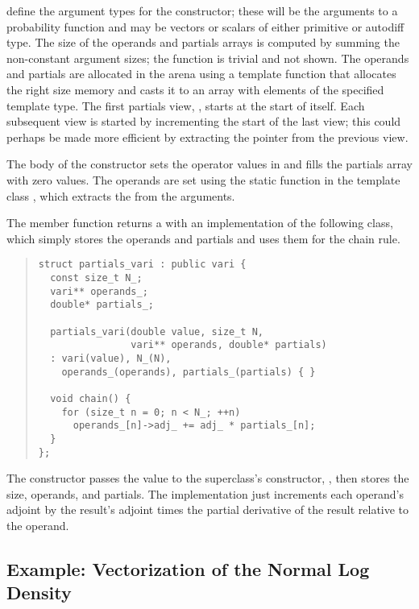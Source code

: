 \documentclass[10pt]{article}
\begin{document}
define the argument types for the constructor; these will be the
arguments to a probability function and may be vectors or scalars of
either primitive or autodiff type.  The size  of the
operands and partials arrays is computed by summing the non-constant
argument sizes; the function  is trivial and not shown.
The operands  and partials  are allocated
in the arena using a template function that allocates the right size
memory and casts it to an array with elements of the specified
template type.  The first partials view, , starts at the
start of  itself.  Each subsequent view is started
by incrementing the start of the last view;  this could perhaps be
made more efficient by extracting the pointer from the previous view.

The body of the constructor sets the operator values in 
and fills the partials array with zero values.  The operands are set
using the static function  in the template class
, which extracts the  from the
arguments.  

The member function  returns a  with
an implementation of the following class, which simply stores the
operands and partials and uses them for the chain rule.
%
\begin{quote}
\begin{Verbatim}
struct partials_vari : public vari {
  const size_t N_;
  vari** operands_;   
  double* partials_;

  partials_vari(double value, size_t N,
                vari** operands, double* partials)
  : vari(value), N_(N),
    operands_(operands), partials_(partials) { }

  void chain() {
    for (size_t n = 0; n < N_; ++n)
      operands_[n]->adj_ += adj_ * partials_[n];
  }
};
\end{Verbatim}
\end{quote}
%
The constructor passes the value to the superclass's constructor,
, then stores the size, operands, and partials.
The  implementation just increments each operand's
adjoint by the result's adjoint times the partial derivative of the
result relative to the operand.

\subsection{Example: Vectorization of the Normal Log Density}
\end{document}
